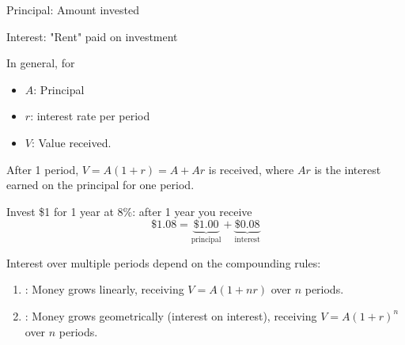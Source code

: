 

\begin{definition}
    Principal: Amount invested

    Interest: "Rent" paid on investment
\end{definition}

In general, for
\begin{itemize}
    \item $A$: Principal
    \item $r$: interest rate per period
    \item $V$: Value received.
\end{itemize}
After 1 period, $V=A(1+r) = A + Ar$ is received, where $Ar$ is the interest earned on the principal for one period.

\begin{center}
\end{center}

\begin{example}
    Invest \$1 for 1 year at 8\%: after 1 year you receive
    \[\$1.08 = \underbrace{\$1.00}_{\text{principal}} + \underbrace{\$0.08}_{\text{interest}}\]
\end{example}

Interest over multiple periods depend on the compounding rules:
\begin{enumerate}
    \item {}: Money grows linearly, receiving $V=A(1+nr)$ over $n$ periods.
    \item {}: Money grows geometrically (interest on interest), receiving $V=A(1+r)^n$ over $n$ periods.
\end{enumerate}

